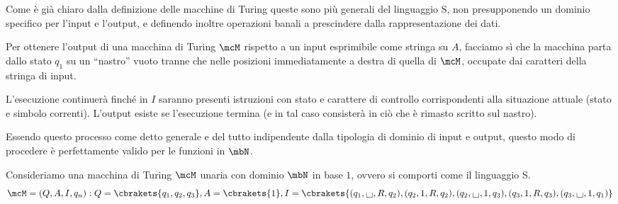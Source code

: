 
Come è già chiaro dalla definizione delle macchine di Turing queste sono più generali del linguaggio S, non presupponendo un dominio specifico per l'input e l'output, e definendo inoltre operazioni banali a prescindere dalla rappresentazione dei dati.

Per ottenere l'output di una macchina di Turing \(\mcM\) rispetto a un input esprimibile come stringa su \(A\), facciamo sì che la macchina parta dallo stato \(q_1\) su un ``nastro'' vuoto tranne che nelle posizioni immediatamente a destra di quella di \(\mcM\), occupate dai caratteri della stringa di input.

L'esecuzione continuerà finché in \(I\) saranno presenti istruzioni con stato e carattere di controllo corrispondenti alla situazione attuale (stato e simbolo correnti).
L'output esiste se l'esecuzione termina (e in tal caso consisterà in ciò che è rimasto scritto sul nastro).

Essendo questo processo come detto generale e del tutto indipendente dalla tipologia di dominio di input e output, questo modo di procedere è perfettamente valido per le funzioni in \(\mbN\).

Consideriamo una macchina di Turing \(\mcM\) unaria con dominio \(\mbN\) in base \(1\), ovvero si comporti come il linguaggio S.
\begin{equation*}
  \mcM = (Q,A,I,q_n) : Q = \cbrakets{q_1, q_2, q_3}, A = \cbrakets{1}, I=\cbrakets{(q_1, \text{\Large{\textbf{\textvisiblespace}}}, R,q_2), (q_2,1,R,q_2), (q_2, \text{\Large{\textbf{\textvisiblespace}}}, 1, q_3), (q_3,1, R, q_3), (q_3, \text{\Large{\textbf{\textvisiblespace}}} , 1, q_1)}
\end{equation*}

